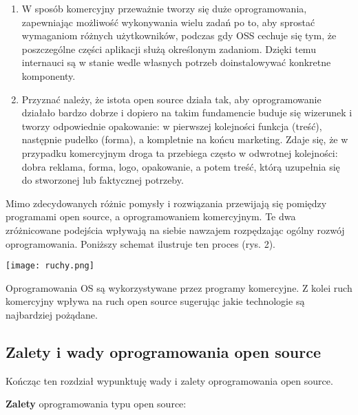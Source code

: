 \documentclass{article}
\begin{document}
\begin{enumerate}
    \item W sposób komercyjny przeważnie tworzy się duże oprogramowania, zapewniając możliwość wykonywania wielu zadań po to, aby sprostać wymaganiom różnych użytkowników, podczas gdy OSS cechuje się tym, że poszczególne części aplikacji służą określonym zadaniom. Dzięki temu internauci są w stanie wedle własnych potrzeb doinstalowywać konkretne komponenty\cite{Kotula}.
    
    \item Przyznać należy, że istota open source działa tak, aby oprogramowanie działało bardzo dobrze i dopiero na takim fundamencie buduje się wizerunek i tworzy odpowiednie opakowanie: w pierwszej kolejności funkcja (treść), następnie pudełko (forma), a kompletnie na końcu marketing. Zdaje się, że w przypadku komercyjnym droga ta przebiega często w odwrotnej kolejności: dobra reklama, forma, logo, opakowanie, a potem treść, którą uzupełnia się do stworzonej lub faktycznej potrzeby\cite{Kotula}.
    \end{enumerate}
    
    Mimo zdecydowanych różnic pomysły i rozwiązania przewijają się pomiędzy programami open source, a oprogramowaniem komercyjnym. Te dwa zróżnicowane podejścia wpływają na siebie nawzajem rozpędzając ogólny rozwój oprogramowania. Poniższy schemat ilustruje ten proces (rys. 2).
    \begin{center}
        \texttt{[image: ruchy.png]}
    \end{center}
    \hspace{4mm} Oprogramowania OS są wykorzystywane przez programy komercyjne. Z kolei ruch komercyjny wpływa na ruch open source sugerując jakie technologie są najbardziej pożądane. \newpage

\subsection{Zalety i wady oprogramowania open source}

\hspace{4mm} Kończąc ten rozdział wypunktuję wady i zalety oprogramowania open source. \newline

\textbf{Zalety} oprogramowania typu open source:
\end{document}

